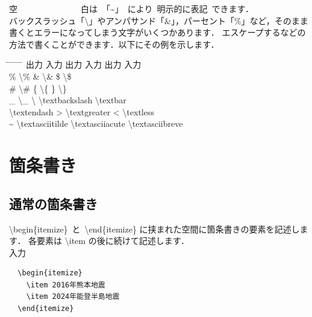 \documentclass[11pt,a4j,onecolumn]{jsreport} %
\begin{document}
空~~~~~~~~~~~~~~~白は~「\textasciitilde」~により~明示的に表記~できます．\\

バックスラッシュ「\textbackslash」やアンパサンド「\&」，パーセント「\%」など，そのまま書くとエラーになってしまう文字がいくつかあります．
エスケープするなどの方法で書くことができます．以下にその例を示します．

\begin{tabbing}
  \hspace{20truemm} \= \hspace{10truemm} \= \hspace{30truemm} \= \hspace{10truemm} \= \hspace{30truemm} \= \hspace{10truemm} \= \hspace{20truemm} \kill
  \> 出力 \> 入力 \> 出力 \> 入力 \> 出力 \> 入力 \\
  \> \% \> \textbackslash\% \> \& \> \textbackslash\& \> \$ \> \textbackslash\$ \\
  \> \# \> \textbackslash\# \> \{ \> \textbackslash\{ \> \} \> \textbackslash\} \\
  \> \_ \> \textbackslash\_ \> \textbackslash \> \textbackslash textbackslash \> \textbar \> \textbackslash textbar \\
  \> \textendash \> \textbackslash textendash \> \textgreater \> \textbackslash textgreater \> \textless \> \textbackslash textless \\
  \> \textasciitilde \> \textbackslash textasciitilde \> \textasciiacute \> \textbackslash textasciiacute \> \textasciibreve \> \textbackslash textasciibreve \\
\end{tabbing}

\section{箇条書き}

\subsection{通常の箇条書き}

\textbackslash begin\{itemize\}~と~\textbackslash end\{itemize\} に挟まれた空間に箇条書きの要素を記述します．
各要素は \textbackslash item の後に続けて記述します．\\

入力
\begin{verbatim}
  \begin{itemize}
    \item 2016年熊本地震
    \item 2024年能登半島地震
  \end{itemize}
\end{verbatim}
\end{document}
